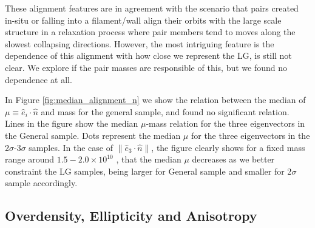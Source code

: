 \documentclass{emulateapj}
\newcommand{\msun}{{\ifmmode{{\rm {M_{\odot}}}}\else{${\rm{M_{\odot}}}$}\fi}}
\begin{document}
These alignment features are in agreement with the scenario that pairs 
created in-situ or falling into a filament/wall align their orbits with 
the large scale structure in a relaxation process where pair members
tend to moves along the slowest collapsing directions.
However, the most intriguing feature is the dependence of this alignment
with how close we represent the LG, is still not clear.
We explore if the pair masses are responsible of this, but we found 
no dependence at all.

In Figure \ref{fig:median_alignment_n} we show the relation between the median 
of $\mu\equiv\hat{e}_i\cdot\hat{n}$ and mass for the general sample, and found 
no significant relation.
Lines in the figure show the median $\mu$-mass relation for the three 
eigenvectors in the General sample.
Dots represent the median $\mu$ for the three eigenvectors in the 
2$\sigma$-3$\sigma$ samples.
In the case of $\|\hat{e}_3\cdot\hat{n}\|$, the figure clearly shows for a fixed mass
range around $1.5-2.0 \times 10^{10}$ \msun, that the median $\mu$ decreases as we
better constraint the LG samples, being larger for General sample and smaller for 
2$\sigma$ sample accordingly.






\subsection{Overdensity, Ellipticity and Anisotropy}
\end{document}
